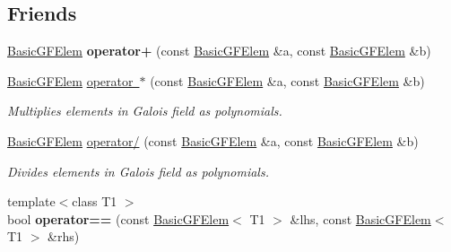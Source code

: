\subsection*{Friends}
\begin{DoxyCompactItemize}
\item 
\mbox{\label{class_g_flinalg_1_1_basic_g_f_elem_a00b203367aa574184f0a4527d197fd17}} 
\mbox{\hyperlink{class_g_flinalg_1_1_basic_g_f_elem}{Basic\+G\+F\+Elem}} {\bfseries operator+} (const \mbox{\hyperlink{class_g_flinalg_1_1_basic_g_f_elem}{Basic\+G\+F\+Elem}} \&a, const \mbox{\hyperlink{class_g_flinalg_1_1_basic_g_f_elem}{Basic\+G\+F\+Elem}} \&b)
\item 
\mbox{\label{class_g_flinalg_1_1_basic_g_f_elem_a7bc2ff6e196784c3a6279bfccb30c1e1}} 
\mbox{\hyperlink{class_g_flinalg_1_1_basic_g_f_elem}{Basic\+G\+F\+Elem}} \mbox{\hyperlink{class_g_flinalg_1_1_basic_g_f_elem_a7bc2ff6e196784c3a6279bfccb30c1e1}{operator $\ast$}} (const \mbox{\hyperlink{class_g_flinalg_1_1_basic_g_f_elem}{Basic\+G\+F\+Elem}} \&a, const \mbox{\hyperlink{class_g_flinalg_1_1_basic_g_f_elem}{Basic\+G\+F\+Elem}} \&b)
\begin{DoxyCompactList}\small\item\em Multiplies elements in Galois field as polynomials. \end{DoxyCompactList}\item 
\mbox{\label{class_g_flinalg_1_1_basic_g_f_elem_aa0960c7b5cd5185a6da5b314c0510476}} 
\mbox{\hyperlink{class_g_flinalg_1_1_basic_g_f_elem}{Basic\+G\+F\+Elem}} \mbox{\hyperlink{class_g_flinalg_1_1_basic_g_f_elem_aa0960c7b5cd5185a6da5b314c0510476}{operator/}} (const \mbox{\hyperlink{class_g_flinalg_1_1_basic_g_f_elem}{Basic\+G\+F\+Elem}} \&a, const \mbox{\hyperlink{class_g_flinalg_1_1_basic_g_f_elem}{Basic\+G\+F\+Elem}} \&b)
\begin{DoxyCompactList}\small\item\em Divides elements in Galois field as polynomials. \end{DoxyCompactList}\item 
\mbox{\label{class_g_flinalg_1_1_basic_g_f_elem_a016f933d636d5ddf436ef5a8870a5b59}} 
{\footnotesize template$<$class T1 $>$ }\\bool {\bfseries operator==} (const \mbox{\hyperlink{class_g_flinalg_1_1_basic_g_f_elem}{Basic\+G\+F\+Elem}}$<$ T1 $>$ \&lhs, const \mbox{\hyperlink{class_g_flinalg_1_1_basic_g_f_elem}{Basic\+G\+F\+Elem}}$<$ T1 $>$ \&rhs)

\end{DoxyCompactItemize}
